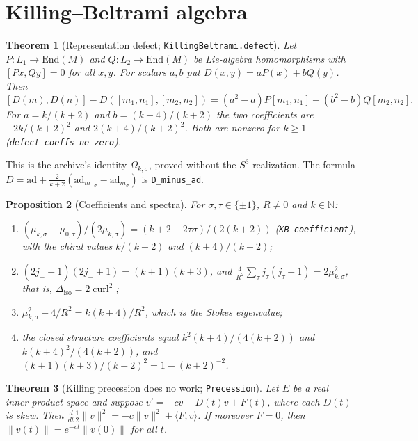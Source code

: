 \documentclass[11pt]{article}
\newtheorem{theorem}{Theorem}[section]
\newtheorem{proposition}[theorem]{Proposition}
\theoremstyle{remark}
\newcommand{\lean}[1]{\texttt{#1}}
\newcommand{\curl}{\operatorname{curl}}
\begin{document}
\section{Killing--Beltrami algebra}
\begin{theorem}[Representation defect; \lean{KillingBeltrami.defect}]
Let $P:L_1\to\mathrm{End}(M)$ and $Q:L_2\to\mathrm{End}(M)$ be Lie-algebra homomorphisms
with $[P x,Q y]=0$ for all $x,y$. For scalars $a,b$ put $D(x,y)=aP(x)+bQ(y)$. Then
\[
[D(m),D(n)]-D([m_1,n_1],[m_2,n_2])=(a^2-a)P[m_1,n_1]+(b^2-b)Q[m_2,n_2].
\]
For $a=k/(k+2)$ and $b=(k+4)/(k+2)$ the two coefficients are $-2k/(k+2)^2$ and
$2(k+4)/(k+2)^2$. Both are nonzero for $k\ge1$ (\lean{defect\_coeffs\_ne\_zero}).
\end{theorem}
This is the archive's identity $\Omega_{k,\sigma}$, proved without the $S^3$ realization.
The formula $D=\mathrm{ad}+\tfrac{2}{k+2}(\mathrm{ad}_{m_{-\sigma}}-\mathrm{ad}_{m_\sigma})$
is \lean{D\_minus\_ad}.

\begin{proposition}[Coefficients and spectra]
For $\sigma,\tau\in\{\pm1\}$, $R\neq0$ and $k\in\mathbb N$:
\begin{enumerate}
\item $(\mu_{k,\sigma}-\mu_{0,\tau})/(2\mu_{k,\sigma})=(k+2-2\tau\sigma)/(2(k+2))$
(\lean{KB\_coefficient}), with the chiral values $k/(k+2)$ and $(k+4)/(k+2)$;
\item $(2j_+ + 1)(2j_- + 1)=(k+1)(k+3)$, and
$\tfrac{4}{R^2}\sum_\tau j_\tau(j_\tau+1)=2\mu_{k,\sigma}^2$, that is,
$\Delta_{\mathrm{iso}}=2\curl^2$;
\item $\mu_{k,\sigma}^2-4/R^2=k(k+4)/R^2$, which is the Stokes eigenvalue;
\item the closed structure coefficients equal $k^2(k+4)/(4(k+2))$ and $k(k+4)^2/(4(k+2))$, and
$(k+1)(k+3)/(k+2)^2=1-(k+2)^{-2}$.
\end{enumerate}
\end{proposition}

\begin{theorem}[Killing precession does no work; \lean{Precession}]
Let $E$ be a real inner-product space and suppose $v'=-cv-D(t)v+F(t)$, where each $D(t)$ is
skew. Then $\tfrac{d}{dt}\tfrac12\|v\|^2=-c\|v\|^2+\langle F,v\rangle$. If moreover $F=0$, then
$\|v(t)\|=e^{-ct}\|v(0)\|$ for all $t$.
\end{theorem}
\end{document}
